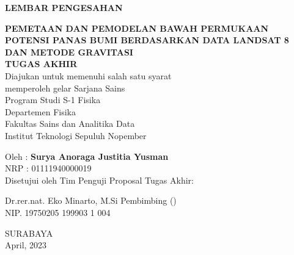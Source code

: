 \newpage
\thispagestyle{empty}
\begin{center}
	\textbf{LEMBAR PENGESAHAN}\\
	\vskip30pt
	
	\textbf{PEMETAAN DAN PEMODELAN BAWAH PERMUKAAN POTENSI PANAS BUMI BERDASARKAN DATA LANDSAT 8 DAN METODE GRAVITASI}\\
	
	\vskip30pt
	\textbf{TUGAS AKHIR}\\
	\doublespacing
	Diajukan untuk memenuhi salah satu syarat\\
	memperoleh gelar Sarjana Sains\\
	Program Studi S-1 Fisika\\
	Departemen Fisika\\
	Fakultas Sains dan Analitika Data\\
	Institut Teknologi Sepuluh Nopember\\
	\vskip 20pt
	
	Oleh : \textbf{Surya Anoraga Justitia Yusman}\\
	NRP : 01111940000019\\
	
	\vskip 50pt
	Disetujui oleh Tim Penguji Proposal Tugas Akhir:
\end{center}
		\vskip 35pt
		Dr.rer.nat. Eko Minarto, M.Si \hfill Pembimbing \hfill (\dotfill)\\
		NIP. 19750205 199903 1 004
\begin{center}
	\vfill
	SURABAYA\\
	April, 2023
\end{center}

\restoregeometry
